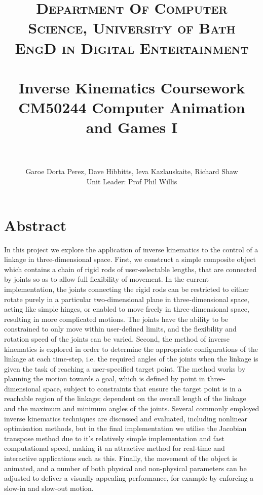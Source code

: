 \documentclass[paper=a4, fontsize=11pt]{scrartcl} %
\title{	
\normalfont \normalsize 
\textsc{Department Of Computer Science, University of Bath} \\ [5pt] %
\textsc{EngD in Digital Entertainment} \\ [5pt] 
\horrule{0.7pt} \\[0.2cm] %
\Huge Inverse Kinematics Coursework \\ %
\vspace{7 mm}
\Large CM50244 \: Computer Animation and Games I \\
\horrule{0.7pt} \\[0.0cm] %
}
\author{Garoe Dorta Perez, Dave Hibbitts, Ieva Kazlauskaite, Richard Shaw \\ \Large Unit Leader: Prof Phil Willis \\}  %
\numberwithin{equation}{section} %
\numberwithin{figure}{section} %
\numberwithin{table}{section} %
\begin{document}
\vspace*{\fill}
\begin{center}
\begin{minipage}{1.0\textwidth}

\clearpage\maketitle %
\thispagestyle{empty}

\end{minipage}
\end{center}
\vfill
\clearpage
\setcounter{page}{1}

\section*{Abstract}

In this project we explore the application of inverse kinematics to the control of a linkage in three-dimensional space. First, we construct a simple composite object which contains a chain of rigid rods of user-selectable lengths, that are connected by joints so as to allow full flexibility of movement. In the current implementation, the joints connecting the rigid rods can be restricted to either rotate purely in a particular two-dimensional plane in three-dimensional space, acting like simple hinges, or enabled to move freely in three-dimensional space, resulting in more complicated motions. The joints have the ability to be constrained to only move within user-defined limits, and the flexibility and rotation speed of the joints can be varied. Second, the method of inverse kinematics is explored in order to determine the appropriate configurations of the linkage at each time-step, i.e. the required angles of the joints when the linkage is given the task of reaching a user-specified target point. The method works by planning the motion towards a goal, which is defined by point in three-dimensional space, subject to constraints that ensure the target point is in a reachable region of the linkage; dependent on the overall length of the linkage and the maximum and minimum angles of the joints. Several commonly employed inverse kinematics techniques are discussed and evaluated, including nonlinear optimisation methods, but in the final implementation we utilise the Jacobian transpose method due to it's relatively simple implementation and fast computational speed, making it an attractive method for real-time and interactive applications such as this. Finally, the movement of the object is animated, and a number of both physical and non-physical parameters can be adjusted to deliver a visually appealing performance, for example by enforcing a slow-in and slow-out motion.
\end{document}
